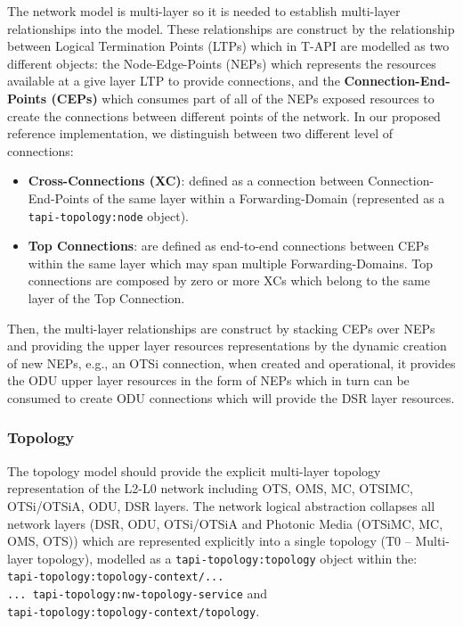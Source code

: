 \documentclass[a4paper,fleqn]{cas-dc}
\begin{document}
The network model is multi-layer so it is needed to establish multi-layer relationships into the model. These relationships are construct by the relationship between Logical Termination Points (LTPs) which in T-API are modelled as two different objects: the Node-Edge-Points (NEPs) which represents the resources available at a give layer LTP to provide connections, and the \textbf{Connection-End-Points (CEPs)} which consumes part of all of the NEPs exposed resources to create the connections between different points of the network. In our proposed reference implementation, we distinguish between two different level of connections:

\begin{itemize}
    \item \textbf{Cross-Connections (XC)}: defined as a connection between Connection-End-Points of the same layer within a Forwarding-Domain (represented as a\\ \texttt{tapi-topology:node} object). 
    \item \textbf{Top Connections}: are defined as end-to-end connections between CEPs within the same layer which may span multiple Forwarding-Domains. Top connections are composed by zero or more XCs which belong to the same layer of the Top Connection.
\end{itemize}

Then, the multi-layer relationships are construct by stacking CEPs over NEPs and providing the upper layer resources representations by the dynamic creation of new NEPs, e.g., an OTSi connection, when created and operational, it provides the ODU upper layer resources in the form of NEPs which in turn can be consumed to create ODU connections which will provide the DSR layer resources.

\subsubsection{Topology}

The topology model should provide the explicit multi-layer topology representation of the L2-L0 network including OTS, OMS, MC, OTSIMC, OTSi/OTSiA, ODU, DSR layers. The network logical abstraction collapses all network layers (DSR, ODU, OTSi/OTSiA and Photonic Media (OTSiMC, MC, OMS, OTS)) which are represented explicitly into a single topology (T0 – Multi-layer topology), modelled as a \texttt{tapi-topology:topology} object within the: \\
\texttt{tapi-topology:topology-context/... \\
... tapi-topology:nw-topology-service} and \\ \texttt{tapi-topology:topology-context/topology}. 
\end{document}

